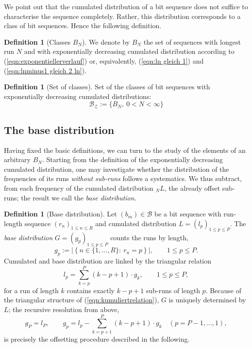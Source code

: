 \documentclass[11pt,a4paper]{scrartcl}
\theoremstyle{plain}
\theoremstyle{definition}
\newtheorem{defi}[satz]{Definition}
\theoremstyle{remark}
\begin{document}
\noindent We point out that the cumulated distribution of a bit
sequence does not suffice to characterise the sequence completely.
Rather, this distribution corresponds to a class of bit sequences.
Hence the following definition.

\begin{defi}[Classes $B_N$]\label{defi:bn}
We denote by $B_N$ the set of sequences with longest run $N$ and with
exponentially decreasing cumulated distribution according to
(\ref{eqn:exponentiellerverlauf}) or, equivalently,
(\ref{eqn:ln gleich 1}) and (\ref{eqn:lnminus1 gleich 2 ln}).
\end{defi}

\begin{defi}[Set of classes]\label{defi:bz}
Set of the classes of bit sequences with exponentially decreasing
cumulated distributions:
\begin{equation}\label{eqn:mengederklassen}
  \mathcal{B_Z} := \{B_N,\ 0< N<\infty \}
\end{equation}
\end{defi}

\subsection{The base distribution}

Having fixed the basic definitions, we can turn to the study of the
elements of an arbitrary $B_N$. Starting from the definition of the
exponentially decreasing cumulated distribution, one may investigate
whether the distribution of the frequencies of its runs \emph{without
sub-runs} follows a systematics. We thus subtract, from each frequency
of the cumulated distribution $_NL$, the already offset sub-runs;
the result we call the \emph{base distribution}.

\begin{defi}[Base distribution]\label{defi:grundverteilung}
Let $(b_m)\in\mathcal B$ be a bit sequence with run-length sequence
$(r_n)_{1\leq n\leq R}$ and cumulated distribution $L=(l_p)_{1\leq
p\leq P}$. The \emph{base distribution} $G=(g_p)_{1\leq p\leq P}$
counts the runs by length,
\begin{equation}\label{eqn:grunddef}
  g_p:=\left|\left\{n\in\{1,\dots,R\}:\ r_n=p\right\}\right|,\qquad 1\leq p\leq P.
\end{equation}
Cumulated and base distribution are linked by the triangular
relation
\begin{equation}\label{eqn:kumuliertrelation}
  l_p=\sum_{k=p}^{P}\left(k-p+1\right)\cdot g_k,\qquad 1\leq p\leq P,
\end{equation}
for a run of length $k$ contains exactly $k-p+1$ sub-runs of length
$p$. Because of the triangular structure of
(\ref{eqn:kumuliertrelation}), $G$ is uniquely determined by $L$;
the recursive resolution from above,
\begin{equation}\label{eqn:abgeltungrekursiv}
  g_P=l_P,\qquad
  g_p=l_p-\sum_{k=p+1}^{P}\left(k-p+1\right)\cdot g_k
  \quad(p=P-1,\dots,1),
\end{equation}
is precisely the offsetting procedure described in the following.
\end{defi}
\end{document}
